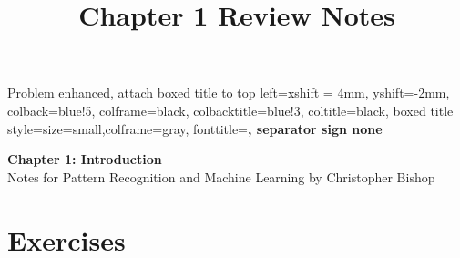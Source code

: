 \documentclass[11pt]{article}
\theoremstyle{definition}
\begin{document}
\setcounter{section}{0}
\title{Chapter 1 Review Notes}

\thispagestyle{empty}


              {Problem}%
  {enhanced, %
  attach boxed title to top left={xshift = 4mm, yshift=-2mm},
  colback=blue!5, colframe=black, colbacktitle=blue!3, coltitle=black,
  boxed title style={size=small,colframe=gray},
  fonttitle=\bfseries,
  separator sign none
  }%
  {} 
\newenvironment{problem}[1]{\begin{prob*}{#1}{}}{\end{prob*}}

\begin{center}
{\LARGE \bf Chapter 1: Introduction}\\
{\large Notes for Pattern Recognition and Machine Learning by Christopher Bishop}\\
\end{center}

\setcounter{tocdepth}{2}
\tableofcontents

\setcounter{secnumdepth}{1}
\section{Exercises}
\end{document}
